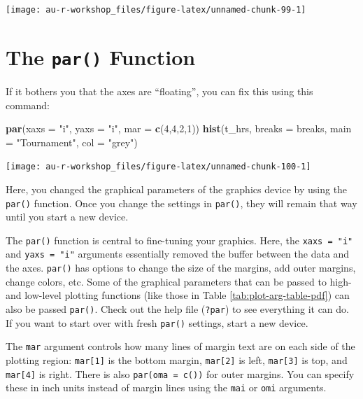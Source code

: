 \documentclass[]{book}
\newenvironment{Shaded}{\begin{snugshade}}{\end{snugshade}}
\newcommand{\DataTypeTok}[1]{\textcolor[rgb]{0.13,0.29,0.53}{#1}}
\newcommand{\DecValTok}[1]{\textcolor[rgb]{0.00,0.00,0.81}{#1}}
\newcommand{\KeywordTok}[1]{\textcolor[rgb]{0.13,0.29,0.53}{\textbf{#1}}}
\newcommand{\NormalTok}[1]{#1}
\newcommand{\StringTok}[1]{\textcolor[rgb]{0.31,0.60,0.02}{#1}}
\begin{document}
\begin{center}\texttt{[image: au-r-workshop\_files/figure-latex/unnamed-chunk-99-1]} \end{center}

\hypertarget{the-par-function}{%
\section{\texorpdfstring{The \texttt{par()} Function}{The par() Function}}\label{the-par-function}}

If it bothers you that the axes are ``floating'', you can fix this using this command:

\begin{Shaded}
\begin{Highlighting}[]
\KeywordTok{par}\NormalTok{(}\DataTypeTok{xaxs =} \StringTok{"i"}\NormalTok{, }\DataTypeTok{yaxs =} \StringTok{"i"}\NormalTok{, }\DataTypeTok{mar =} \KeywordTok{c}\NormalTok{(}\DecValTok{4}\NormalTok{,}\DecValTok{4}\NormalTok{,}\DecValTok{2}\NormalTok{,}\DecValTok{1}\NormalTok{))}
\KeywordTok{hist}\NormalTok{(t_hrs, }\DataTypeTok{breaks =}\NormalTok{ breaks, }\DataTypeTok{main =} \StringTok{"Tournament"}\NormalTok{, }\DataTypeTok{col =} \StringTok{"grey"}\NormalTok{)}
\end{Highlighting}
\end{Shaded}

\begin{center}\texttt{[image: au-r-workshop\_files/figure-latex/unnamed-chunk-100-1]} \end{center}

Here, you changed the graphical parameters of the graphics device by using the \texttt{par()} function. Once you change the settings in \texttt{par()}, they will remain that way until you start a new device.

The \texttt{par()} function is central to fine-tuning your graphics. Here, the \texttt{xaxs\ =\ "i"} and \texttt{yaxs\ =\ "i"} arguments essentially removed the buffer between the data and the axes. \texttt{par()} has options to change the size of the margins, add outer margins, change colors, etc. Some of the graphical parameters that can be passed to high- and low-level plotting functions (like those in Table \ref{tab:plot-arg-table-pdf}) can also be passed \texttt{par()}. Check out the help file (\texttt{?par}) to see everything it can do. If you want to start over with fresh \texttt{par()} settings, start a new device.

The \texttt{mar} argument controls how many lines of margin text are on each side of the plotting region: \texttt{mar{[}1{]}} is the bottom margin, \texttt{mar{[}2{]}} is left, \texttt{mar{[}3{]}} is top, and \texttt{mar{[}4{]}} is right. There is also \texttt{par(oma\ =\ c())} for outer margins. You can specify these in inch units instead of margin lines using the \texttt{mai} or \texttt{omi} arguments.
\end{document}
